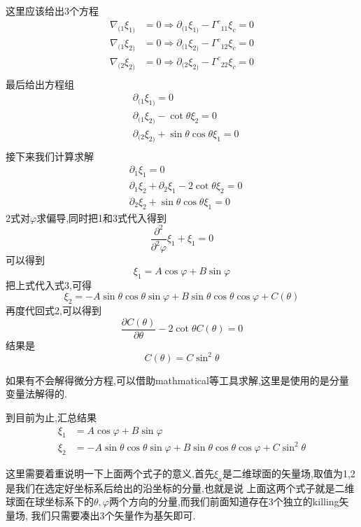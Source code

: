 \documentclass[../main.tex]{subfiles}
\begin{document}
这里应该给出3个方程
\begin{align*}
	\nabla_{(1}\xi_{1)} & = 0 \Rightarrow \partial_{(1}\xi_{1)} - \Gamma^{c}{}_{11}\xi_c = 0  \\
	\nabla_{(1}\xi_{2)} & = 0 \Rightarrow  \partial_{(1}\xi_{2)} - \Gamma^{c}{}_{12}\xi_c = 0 \\
	\nabla_{(2}\xi_{2)} & = 0 \Rightarrow  \partial_{(2}\xi_{2)} - \Gamma^{c}{}_{22}\xi_c = 0 \\
\end{align*}
最后给出方程组
\begin{align*}
	 & \partial_{(1}\xi_{1)} = 0                                 \\
	 & \partial_{(1}\xi_{2)} - \cot \theta \xi_2 = 0             \\
	 & \partial_{(2}\xi_{2)} + \sin \theta \cos \theta \xi_1 = 0 \\
\end{align*}
接下来我们计算求解
\begin{align}
	 & \partial_{1}\xi_{1} = 0                                          \\
	 & \partial_{1}\xi_{2}+ \partial_{2}\xi_{1}-2 \cot \theta \xi_2 = 0 \\
	 & \partial_{2}\xi_{2} + \sin \theta \cos \theta \xi_1 = 0
\end{align}
2式对$\varphi$求偏导,同时把1和3式代入得到
$$
	\frac{\partial^2}{\partial^2 \varphi} \xi_1 + \xi_1 = 0
$$
可以得到$$
	\xi_1 = A\cos \varphi + B \sin \varphi$$
把上式代入式3,可得$$
	\xi_2 = -A \sin \theta \cos \theta \sin \varphi + B \sin \theta \cos \theta \cos \varphi + C(\theta)$$
再度代回式2,可以得到$$
	\frac{\partial C(\theta)}{\partial \theta} - 2\cot \theta C(\theta) = 0$$
结果是$$
	C(\theta) = C \sin^2 \theta$$
\begin{note}
	如果有不会解得微分方程,可以借助mathmatical等工具求解,这里是使用的是分量变量法解得的.
\end{note}
到目前为止,汇总结果\begin{align*}
	\xi_1 & = A\cos \varphi + B \sin \varphi                                                                    \\
	\xi_2 & =- A \sin \theta \cos \theta \sin \varphi + B \sin \theta \cos \theta \cos \varphi + C\sin^2 \theta
\end{align*}
\begin{note}
	这里需要着重说明一下上面两个式子的意义,首先$\xi_a$是二维球面的矢量场,取值为1,2是我们在选定好坐标系后给出的沿坐标的分量,也就是说
	上面这两个式子就是二维球面在球坐标系下的$\theta ,\varphi$两个方向的分量,而我们前面知道存在3个独立的killing矢量场,
	我们只需要凑出3个矢量作为基矢即可.
\end{note}
\end{document}
